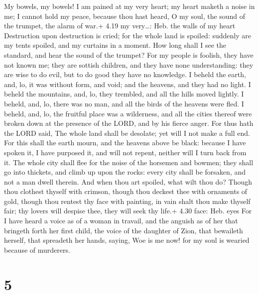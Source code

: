  My bowels, my bowels! I am pained at my very heart; my
heart maketh a noise in me; I cannot hold my peace, because thou hast
heard, O my soul, the sound of the trumpet, the alarm of war.+ 4.19 my
very\ldots: Heb. the walls of my heart  Destruction upon
destruction is cried; for the whole land is spoiled: suddenly are my
tents spoiled, and my curtains in a moment.  How long shall
I see the standard, and hear the sound of the trumpet?  For
my people is foolish, they have not known me; they are sottish children,
and they have none understanding: they are wise to do evil, but to do
good they have no knowledge.  I beheld the earth, and, lo,
it was without form, and void; and the heavens, and they had no light.
 I beheld the mountains, and, lo, they trembled, and all
the hills moved lightly.  I beheld, and, lo, there was no
man, and all the birds of the heavens were fled.  I beheld,
and, lo, the fruitful place was a wilderness, and all the cities thereof
were broken down at the presence of the LORD, and by his fierce anger.
 For thus hath the LORD said, The whole land shall be
desolate; yet will I not make a full end.  For this shall
the earth mourn, and the heavens above be black: because I have spoken
it, I have purposed it, and will not repent, neither will I turn back
from it.  The whole city shall flee for the noise of the
horsemen and bowmen; they shall go into thickets, and climb up upon the
rocks: every city shall be forsaken, and not a man dwell therein.
 And when thou art spoiled, what wilt thou do? Though thou
clothest thyself with crimson, though thou deckest thee with ornaments
of gold, though thou rentest thy face with painting, in vain shalt thou
make thyself fair; thy lovers will despise thee, they will seek thy
life.+ 4.30 face: Heb. eyes  For I have heard a voice as of
a woman in travail, and the anguish as of her that bringeth forth her
first child, the voice of the daughter of Zion, that bewaileth herself,
that spreadeth her hands, saying, Woe is me now! for my soul is wearied
because of murderers.

\hypertarget{section-4}{%
\section{5}\label{section-4}}

